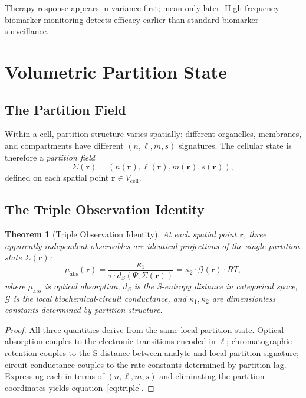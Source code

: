 \documentclass[twocolumn,10pt,a4paper]{article}
\newtheorem{theorem}{Theorem}[section]
\theoremstyle{definition}
\theoremstyle{remark}
\newcommand{\Gcond}{\mathcal{G}}
\begin{document}
Therapy response appears in variance first; mean only later. High-frequency biomarker monitoring detects efficacy earlier than standard biomarker surveillance.

\section{Volumetric Partition State}

\subsection{The Partition Field}

Within a cell, partition structure varies spatially: different organelles, membranes, and compartments have different $(n,\ell,m,s)$ signatures. The cellular state is therefore a \emph{partition field}
\begin{equation}
    \Sigma(\mathbf{r}) = (n(\mathbf{r}), \ell(\mathbf{r}), m(\mathbf{r}), s(\mathbf{r})),
\end{equation}
defined on each spatial point $\mathbf{r}\in V_{\mathrm{cell}}$.

\subsection{The Triple Observation Identity}

\begin{theorem}[Triple Observation Identity]
\label{thm:triple}
At each spatial point $\mathbf{r}$, three apparently independent observables are identical projections of the single partition state $\Sigma(\mathbf{r})$:
\begin{equation}
    \mu_{\mathrm{abs}}(\mathbf{r}) = \frac{\kappa_1}{\tau\cdot d_S(\Psi,\Sigma(\mathbf{r}))} = \kappa_2\cdot\Gcond(\mathbf{r})\cdot RT,
    \label{eq:triple}
\end{equation}
where $\mu_{\mathrm{abs}}$ is optical absorption, $d_S$ is the S-entropy distance in categorical space, $\Gcond$ is the local biochemical-circuit conductance, and $\kappa_1,\kappa_2$ are dimensionless constants determined by partition structure.
\end{theorem}

\begin{proof}
All three quantities derive from the same local partition state. Optical absorption couples to the electronic transitions encoded in $\ell$; chromatographic retention couples to the S-distance between analyte and local partition signature; circuit conductance couples to the rate constants determined by partition lag. Expressing each in terms of $(n,\ell,m,s)$ and eliminating the partition coordinates yields equation~\eqref{eq:triple}.
\end{proof}
\end{document}
